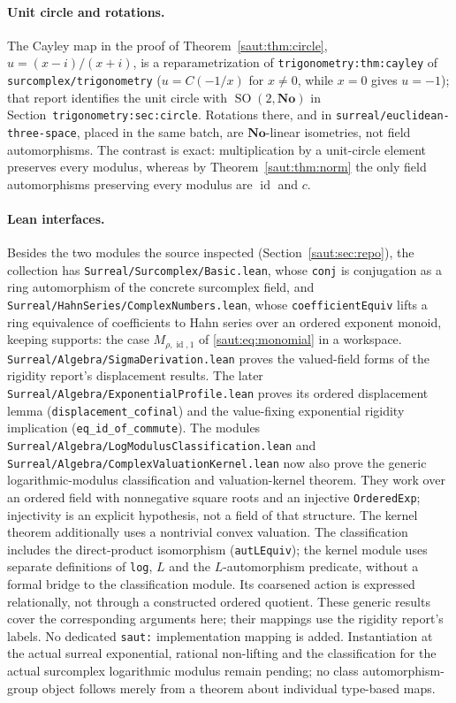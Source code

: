 \documentclass[11pt]{article}
\theoremstyle{definition}
\theoremstyle{remark}
\newcommand{\No}{\mathbf{No}}
\newcommand{\id}{\operatorname{id}}
\newcommand{\repo}[1]{\nolinkurl{#1}}%
\newcommand{\lbl}[1]{\nolinkurl{#1}}%
\numberwithin{equation}{section}
\begin{document}
\paragraph{Unit circle and rotations.} The Cayley map in the proof of
Theorem~\ref{saut:thm:circle}, $u=(x-i)/(x+i)$, is a reparametrization of
\lbl{trigonometry:thm:cayley} of \repo{surcomplex/trigonometry}
($u=C(-1/x)$ for $x\ne0$, while $x=0$ gives $u=-1$);
that report identifies the unit circle with
$\operatorname{SO}(2,\No)$ in Section~\lbl{trigonometry:sec:circle}.
Rotations there, and in \repo{surreal/euclidean-three-space}, placed in the
same batch, are $\No$-linear isometries, not field automorphisms. The
contrast is exact: multiplication by a unit-circle element preserves every
modulus, whereas by Theorem~\ref{saut:thm:norm} the only field
automorphisms preserving every modulus are $\id$ and $c$.

\paragraph{Lean interfaces.} Besides the two modules the source inspected
(Section~\ref{saut:sec:repo}), the collection has
\nolinkurl{Surreal/Surcomplex/Basic.lean}, whose \texttt{conj} is conjugation
as a ring automorphism of the concrete surcomplex field, and
\nolinkurl{Surreal/HahnSeries/ComplexNumbers.lean}, whose
\texttt{coefficientEquiv} lifts a ring equivalence of coefficients to Hahn
series over an ordered exponent monoid, keeping supports: the case
$M_{\rho,\id,1}$ of \eqref{saut:eq:monomial} in a workspace. \nolinkurl{Surreal/Algebra/SigmaDerivation.lean}
proves the valued-field forms of the rigidity report's displacement results.
The later \nolinkurl{Surreal/Algebra/ExponentialProfile.lean} proves its
ordered displacement lemma (\texttt{displacement\_cofinal}) and the
value-fixing exponential rigidity implication (\texttt{eq\_id\_of\_commute}).
The modules \nolinkurl{Surreal/Algebra/LogModulusClassification.lean} and
\nolinkurl{Surreal/Algebra/ComplexValuationKernel.lean} now also prove the
generic logarithmic-modulus classification and valuation-kernel theorem.
They work over an ordered field with nonnegative square roots and an
injective \texttt{OrderedExp}; injectivity is an explicit hypothesis,
not a field of that structure. The kernel theorem additionally uses a
nontrivial convex valuation. The classification includes the direct-product
isomorphism (\texttt{autLEquiv}); the kernel module uses separate definitions
of \texttt{log}, $L$ and the $L$-automorphism predicate, without a formal
bridge to the classification module. Its coarsened action is expressed
relationally, not through a constructed ordered quotient.
These generic results cover the corresponding arguments here;
their mappings use the rigidity report's labels. No dedicated
\texttt{saut:} implementation mapping is added. Instantiation at the actual
surreal exponential, rational non-lifting and the classification for the
actual surcomplex logarithmic modulus remain pending; no class automorphism-group object follows
merely from a theorem about individual type-based maps.
\end{document}
